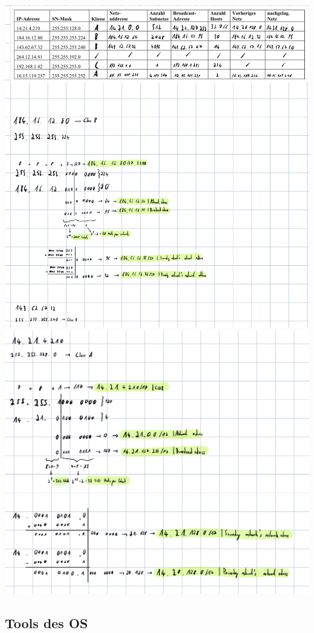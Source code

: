 \includegraphics{./static/ipcalc_1.png}
\includegraphics{./static/ipcalc_2.png}

\hypertarget{tools-des-os}{%
\subsection{Tools des OS}\label{tools-des-os}}

